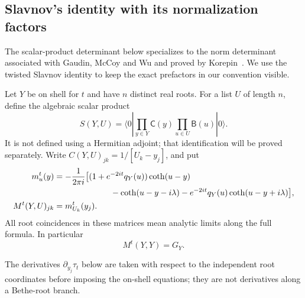 \subsection{Slavnov's identity with its normalization factors}

The scalar-product determinant below specializes to the norm determinant
associated with Gaudin, McCoy and Wu and proved by
Korepin~\cite{GaudinMcCoyWu1981,Korepin1982}. We use the twisted
Slavnov identity to keep the exact prefactors in our convention visible.

Let $Y$ be on shell for $t$ and have $n$ distinct real roots.  For a
list $U$ of length $n$, define the algebraic scalar product
\begin{equation}\label{eq:ABA-scalar}
 S(Y,U)=\langle0|\prod_{y\in Y}\mathsf C(y)
                         \prod_{u\in U}\mathsf B(u)|0\rangle.
\end{equation}
It is not defined using a Hermitian adjoint; that identification will
be proved separately.  Write $C(Y,U)_{jk}=1/[U_k-y_j]$, and put
\begin{align}
 m_u^t(y)&=-\frac1{2\pi i}\bigl[(1+e^{-2it}q_Y(u))\coth(u-y)
                 \notag\\
 &\hspace{24mm}-\coth(u-y-i\lambda)
                 -e^{-2it}q_Y(u)\coth(u-y+i\lambda)\bigr],
 \label{eq:finite-source-column}\\
 M^t(Y,U)_{jk}&=m_{U_k}^t(y_j).
 \label{eq:reduced-scalar-matrix}
\end{align}
All root coincidences in these matrices mean analytic limits along
the full formula.  In particular
\begin{equation}\label{eq:source-Gaudin-limit}
 M^t(Y,Y)=G_Y.
\end{equation}

The derivatives $\partial_{y_j}\tau_t$ below are taken with respect
to the independent root coordinates before imposing the on-shell
equations; they are not derivatives along a Bethe-root branch.


